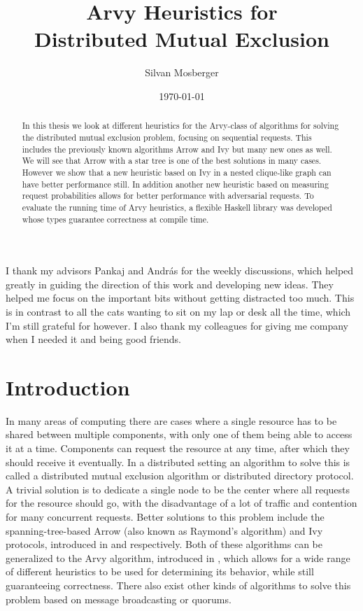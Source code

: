 \documentclass[a4paper, oneside]{discothesis}
\title{Arvy Heuristics for \\Distributed Mutual Exclusion}
\author{Silvan Mosberger}
\institute{Distributed Computing Group \\[2pt]
Computer Engineering and Networks Laboratory \\[2pt]
ETH Zürich}
\date{\today}
\begin{document}
\frontmatter
\maketitle

\cleardoublepage

\begin{acknowledgements}
I thank my advisors Pankaj and András for the weekly discussions, which helped greatly in guiding the direction of this work and developing new ideas. They helped me focus on the important bits without getting distracted too much. This is in contrast to all the cats wanting to sit on my lap or desk all the time, which I'm still grateful for however. I also thank my colleagues for giving me company when I needed it and being good friends.
\end{acknowledgements}


\begin{abstract}
In this thesis we look at different heuristics for the Arvy-class of algorithms for solving the distributed mutual exclusion problem, focusing on sequential requests. This includes the previously known algorithms Arrow and Ivy but many new ones as well. We will see that Arrow with a star tree is one of the best solutions in many cases. However we show that a new heuristic based on Ivy in a nested clique-like graph can have better performance still. In addition another new heuristic based on measuring request probabilities allows for better performance with adversarial requests. To evaluate the running time of Arvy heuristics, a flexible Haskell library was developed whose types guarantee correctness at compile time.
\end{abstract}

\tableofcontents

\mainmatter

\chapter{Introduction}

In many areas of computing there are cases where a single resource has to be shared between multiple components, with only one of them being able to access it at a time. Components can request the resource at any time, after which they should receive it eventually. In a distributed setting an algorithm to solve this is called a distributed mutual exclusion algorithm or distributed directory protocol. A trivial solution is to dedicate a single node to be the center where all requests for the resource should go, with the disadvantage of a lot of traffic and contention for many concurrent requests. Better solutions to this problem include the spanning-tree-based Arrow (also known as Raymond's algorithm) and Ivy protocols, introduced in \cite{Ray} and \cite{Ivy} respectively. Both of these algorithms can be generalized to the Arvy algorithm, introduced in \cite{Arvy}, which allows for a wide range of different heuristics to be used for determining its behavior, while still guaranteeing correctness. There also exist other kinds of algorithms to solve this problem based on message broadcasting or quorums.
\end{document}
